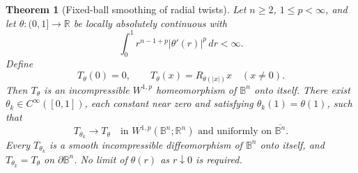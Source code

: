 \documentclass[11pt]{article}
\newtheorem{theorem}{Theorem}
\theoremstyle{remark}
\newcommand{\R}{\mathbb{R}}
\newcommand{\B}{\mathbb{B}}
\begin{document}
\begin{theorem}[Fixed-ball smoothing of radial twists]
\label{thm:twist}
Let $n\geq2$, $1\leq p<\infty$, and let
$\theta:(0,1]\to\R$ be locally absolutely continuous with
\[
 \int_0^1 r^{n-1+p}|\theta'(r)|^p\,dr<\infty.
 \tag{4.1}\label{eq:weighted}
\]
Define
\[
 T_\theta(0)=0,
 \qquad T_\theta(x)=R_{\theta(|x|)}x\quad (x\ne0).
\]
Then $T_\theta$ is an incompressible $W^{1,p}$ homeomorphism of
$\B^n$ onto itself.  There exist $\theta_k\in C^\infty([0,1])$, each
constant near zero and satisfying $\theta_k(1)=\theta(1)$, such that
\[
 T_{\theta_k}\longrightarrow T_\theta
 \quad\text{in }W^{1,p}(\B^n;\R^n)\text{ and uniformly on }\overline{\B^n}.
\]
Every $T_{\theta_k}$ is a smooth incompressible diffeomorphism of $\B^n$
onto itself, and $T_{\theta_k}=T_\theta$ on $\partial\B^n$.
No limit of $\theta(r)$ as $r\downarrow0$ is required.
\end{theorem}
\end{document}
